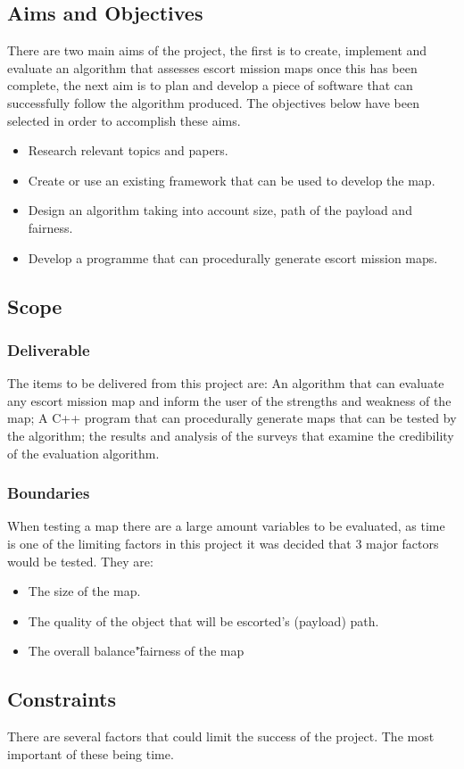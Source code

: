 \documentclass{article}
\begin{document}
\subsection{Aims and Objectives}
There are two main aims of the project, the first is to create, implement and evaluate an algorithm that assesses escort mission maps once this has been complete, the next aim is to plan and develop a piece of software that can successfully follow the algorithm produced. The objectives below have been selected in order to accomplish these aims.
\begin{itemize}
	\item Research relevant topics and papers.
	\item Create or use an existing framework that can be used to develop the map.
	\item Design an algorithm taking into account size, path of the payload and fairness. 
	\item Develop a programme that can procedurally generate escort mission maps.	
\end{itemize}
\subsection{Scope}
\subsubsection{Deliverable}
The items to be delivered from this project are: An algorithm that can evaluate any escort mission map and inform the user of the strengths and weakness of the map; A C++ program that can procedurally generate maps that can be tested by the algorithm; the results and analysis of the surveys that examine the credibility of the evaluation algorithm.  
\subsubsection{Boundaries}
When testing a map there are a large amount variables to be evaluated, as time is one of the limiting factors in this project it was decided that 3 major factors would be tested. They are:
\begin{itemize}
	\item The size of the map.
	\item The quality of the object that will be escorted's (payload) path.
	\item The overall balance"\"fairness of the map 	
\end{itemize}
\subsection{Constraints}
There are several factors that could limit the success of the project. The most important of these being time.
\end{document}
